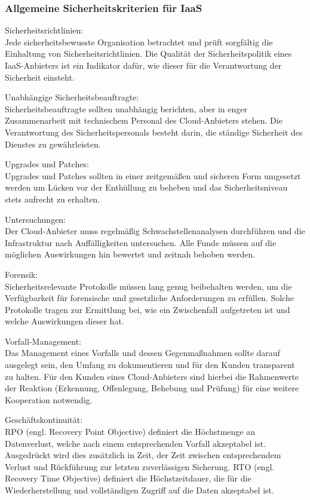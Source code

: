 \documentclass[12pt,a4paper,bibliography=totocnumbered,listof=totocnumbered]{scrartcl}
\begin{document}
\subsubsection{Allgemeine Sicherheitskriterien für IaaS}
\begin{compactitem}
\item Sicherheitsrichtlinien:\\
Jede sicherheitsbewusste Organisation betrachtet und prüft sorgfältig die Einhaltung von Sicherheitsrichtlinien. Die Qualität der Sicherheitspolitik eines IaaS-Anbieters ist ein Indikator dafür, wie dieser für die Verantwortung der Sicherheit einsteht.
\item Unabhängige Sicherheitsbeauftragte:\\
Sicherheitsbeauftragte sollten unabhängig berichten, aber in enger Zusammenarbeit mit technischem Personal des Cloud-Anbieters stehen. Die Verantwortung des Sicherheitspersonals besteht darin, die ständige Sicherheit des Dienstes zu gewährleisten.
\item Upgrades und Patches:\\
Upgrades und Patches sollten in einer zeitgemäßen und sicheren Form umgesetzt werden um Lücken vor der Enthüllung zu beheben und das Sicherheitsniveau stets aufrecht zu erhalten.
\item Untersuchungen:\\
Der Cloud-Anbieter muss regelmäßig Schwachstellenanalysen durchführen und die Infrastruktur nach Auffälligkeiten untersuchen. Alle Funde müssen auf die möglichen Auswirkungen hin bewertet und zeitnah behoben werden.
\item Forensik:\\
Sicherheitsrelevante Protokolle müssen lang genug beibehalten werden, um die Verfügbarkeit für forensische und gesetzliche Anforderungen zu erfüllen. Solche Protokolle tragen zur Ermittlung bei, wie ein Zwischenfall aufgetreten ist und welche Auswirkungen dieser hat.
\item Vorfall-Management:\\
Das Management eines Vorfalls und dessen Gegenmaßnahmen sollte darauf ausgelegt sein, den Umfang zu dokumentieren und für den Kunden transparent zu halten. Für den Kunden eines Cloud-Anbieters sind hierbei die Rahmenwerte der Reaktion (Erkennung, Offenlegung, Behebung und Prüfung) für eine weitere Kooperation notwendig.
\item Geschäftskontinuität:\\
RPO (engl. Recovery Point Objective) definiert die Höchstmenge an Datenverlust, welche nach einem entsprechenden Vorfall akzeptabel ist. Ausgedrückt wird dies zusätzlich in Zeit, der Zeit zwischen entsprechendem Verlust und Rückführung zur letzten zuverlässigen Sicherung. RTO (engl. Recovery Time Objective) definiert die Höchstzeitdauer, die für die Wiederherstellung und vollständigen Zugriff auf die Daten akzeptabel ist.
\end{compactitem}
\cite{38}
\end{document}
